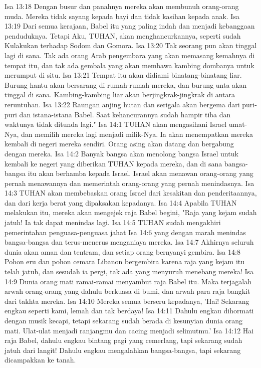 Isa 13:18  Dengan busur dan panahnya mereka akan membunuh orang-orang muda. Mereka tidak sayang kepada bayi dan tidak kasihan kepada anak.
Isa 13:19  Dari semua kerajaan, Babel itu yang paling indah dan menjadi kebanggaan penduduknya. Tetapi Aku, TUHAN, akan menghancurkannya, seperti sudah Kulakukan terhadap Sodom dan Gomora.
Isa 13:20  Tak seorang pun akan tinggal lagi di sana. Tak ada orang Arab pengembara yang akan memasang kemahnya di tempat itu, dan tak ada gembala yang akan membawa kambing dombanya untuk merumput di situ.
Isa 13:21  Tempat itu akan didiami binatang-binatang liar. Burung hantu akan bersarang di rumah-rumah mereka, dan burung unta akan tinggal di sana. Kambing-kambing liar akan berjingkrak-jingkrak di antara reruntuhan.
Isa 13:22  Raungan anjing hutan dan serigala akan bergema dari puri-puri dan istana-istana Babel. Saat kehancurannya sudah hampir tiba dan waktunya tidak ditunda lagi."
Isa 14:1  TUHAN akan mengasihani Israel umat-Nya, dan memilih mereka lagi menjadi milik-Nya. Ia akan menempatkan mereka kembali di negeri mereka sendiri. Orang asing akan datang dan bergabung dengan mereka.
Isa 14:2  Banyak bangsa akan menolong bangsa Israel untuk kembali ke negeri yang diberikan TUHAN kepada mereka, dan di sana bangsa-bangsa itu akan berhamba kepada Israel. Israel akan menawan orang-orang yang pernah menawannya dan memerintah orang-orang yang pernah menindasnya.
Isa 14:3  TUHAN akan membebaskan orang Israel dari kesakitan dan penderitaannya, dan dari kerja berat yang dipaksakan kepadanya.
Isa 14:4  Apabila TUHAN melakukan itu, mereka akan mengejek raja Babel begini, "Raja yang kejam sudah jatuh! Ia tak dapat menindas lagi.
Isa 14:5  TUHAN sudah mengakhiri pemerintahan penguasa-penguasa jahat
Isa 14:6  yang dengan marah menindas bangsa-bangsa dan terus-menerus menganiaya mereka.
Isa 14:7  Akhirnya seluruh dunia akan aman dan tentram, dan setiap orang bernyanyi gembira.
Isa 14:8  Pohon eru dan pohon cemara Libanon bergembira karena raja yang kejam itu telah jatuh, dan sesudah ia pergi, tak ada yang menyuruh menebang mereka!
Isa 14:9  Dunia orang mati ramai-ramai menyambut raja Babel itu. Maka terjagalah arwah orang-orang yang dahulu berkuasa di bumi, dan arwah para raja bangkit dari takhta mereka.
Isa 14:10  Mereka semua berseru kepadanya, 'Hai! Sekarang engkau seperti kami, lemah dan tak berdaya!
Isa 14:11  Dahulu engkau dihormati dengan musik kecapi, tetapi sekarang sudah berada di kesunyian dunia orang mati. Ulat-ulat menjadi ranjangmu dan cacing menjadi selimutmu.'
Isa 14:12  Hai raja Babel, dahulu engkau bintang pagi yang cemerlang, tapi sekarang sudah jatuh dari langit! Dahulu engkau mengalahkan bangsa-bangsa, tapi sekarang dicampakkan ke tanah.
